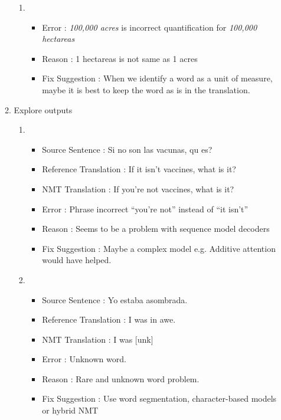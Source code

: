 \documentclass[]{article}
\begin{document}
\begin{enumerate}
\begin{enumerate}
\begin{enumerate}
					\item 
					\begin{itemize}
						\item Error : \textit{100,000 acres} is incorrect quantification for \textit{100,000 hectareas}
						\item Reason : 1 hectareas is not same as 1 acres
						\item Fix Suggestion : When we identify a word as a unit of measure, maybe it is best to keep the word as is in the translation. 
					\end{itemize}
					
		\end{enumerate}
		
		\item
		Explore outputs
		
				\begin{enumerate}
					\item 
					\begin{itemize}
						\item Source Sentence : Si no son las vacunas, qu es?
						\item Reference Translation  : If it isn't vaccines, what is it?
						\item NMT Translation : If you're not vaccines, what is it?
						\item Error : Phrase incorrect \enquote{you're not} instead of \enquote{it isn't}
						\item Reason : Seems to be a problem with sequence model decoders
						\item Fix Suggestion :  Maybe a complex model e.g.  Additive attention would have helped.  
					\end{itemize}

					\item 
					\begin{itemize}
						\item Source Sentence : Yo estaba asombrada.
						\item Reference Translation  : I was in awe.
						\item NMT Translation : I was [unk]
						\item Error : Unknown word.
						\item Reason : Rare and unknown word problem.
						\item Fix Suggestion :  Use word segmentation, character-based models or hybrid NMT
					\end{itemize}
			\end{enumerate}
	

\end{enumerate}
\end{enumerate}
\end{document}
